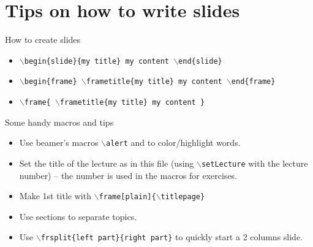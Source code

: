 \documentclass{beamer}
\begin{document}
\frame[plain]{\titlepage}


\section{Tips on how to write slides}


\begin{slide}{How to create slides}
\small

\begin{itemize}
	\item \alert{\texttt{$\backslash$begin\{slide\}\{my title\} my content $\backslash$end\{slide\}}}
	\item \alert{\texttt{$\backslash$begin\{frame\} $\backslash$frametitle\{my title\} my content $\backslash$end\{frame\}}}
	\item \alert{\texttt{$\backslash$frame\{ $\backslash$frametitle\{my title\} my content \}}}
\end{itemize}
\end{slide}


\begin{slide}{Some handy macros and tips}
  \begin{itemize}
    \item Use beamer's macros \alert{\texttt{$\backslash$alert}} and  to color/highlight words.

    \item{Set the title of the lecture as in this file (using \alert{\texttt{$\backslash$setLecture}} with the lecture number) -- the number is used in the macros for exercises.}

		\item Make 1st title with \alert{\texttt{$\backslash$frame[plain]\{$\backslash$titlepage\}}}

		\item Use sections to separate topics.

    \item Use \alert{\texttt{$\backslash$frsplit\{left part\}\{right part\}}} to quickly start a 2 columns slide.
  \end{itemize}
\end{slide}
\end{document}

